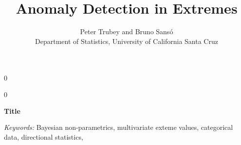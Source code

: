\documentclass[12pt]{article}
\title{Anomaly Detection in Extremes}
\author{Peter Trubey and Bruno Sans\'o\\
Department of Statistics, University of California Santa Cruz\\
}
\newcommand{\blind}{0}
\begin{document}
\def\spacingset#1{\renewcommand{\baselinestretch}%
{#1}\small\normalsize} \spacingset{1}
\blind
{
  \maketitle
} \fi
{}\blind
{
  \bigskip
  \bigskip
  \bigskip
  \begin{center}
    {\LARGE\bf Title}
\end{center}
  \medskip
} \fi

\bigskip
\begin{abstract}  
  
\end{abstract}

\noindent%
{\it Keywords:}  Bayesian non-parametrics, multivariate exteme values, categorical data, directional statistics, 
\vfill

\newpage
\spacingset{1.8} %







% 













\end{document}
